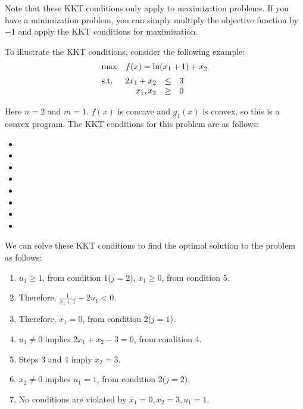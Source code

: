 \documentclass[12pt]{article}
\begin{document}
\noindent
Note that these KKT conditions only apply to maximization problems.
If you have a minimization problem, you can simply multiply the objective function by $-1$ and apply the KKT conditions for maximization.

\newpage
\noindent
To illustrate the KKT conditions, consider the following example:
\begin{align*}
    &\mathrm{max} \quad f(x) = \ln(x_1 + 1) + x_2 \\[2pt]
    &\mathrm{s.t.} \quad 
    \begin{array}[t]{r c l}
        2x_1 + x_2 & \leq & 3 \\
        x_1, x_2 & \geq & 0
    \end{array}
\end{align*}

\noindent
Here $n = 2$ and $m = 1$.
$f(x)$ is concave and $g_1(x)$ is convex, so this is a convex program.
The KKT conditions for this problem are as follows:

\begin{itemize}[wide=10pt]
    \item[1($j = 1$).]{}
    \item[2($j = 1$).]{}
    \item[1($j = 2$).]{}
    \item[2($j = 2$).]{}
    \item[3.]{}
    \item[4.]{}
    \item[5.]{}
    \item[6.]{}
\end{itemize}

\noindent
We can solve these KKT conditions to find the optimal solution to the problem as follows:

\begin{enumerate}
    \item $u_1 \geq 1$, from condition 1($j = 2$), $x_1 \geq 0$, from condition 5.
    \item Therefore, $\displaystyle\frac{1}{x_1 + 1} - 2u_1 < 0$.
    \item Therefore, $x_1 = 0$, from condition 2($j = 1$).
    \item $u_1 \neq 0$ implies $2x_1 + x_2 - 3 = 0$, from condition 4.
    \item Steps 3 and 4 imply $x_2 = 3$.
    \item $x_2 \neq 0$ implies $u_1 = 1$, from condition 2($j = 2$).
    \item No conditions are violated by $x_1 = 0, x_2 = 3, u_1 = 1$.
\end{enumerate}
\end{document}
